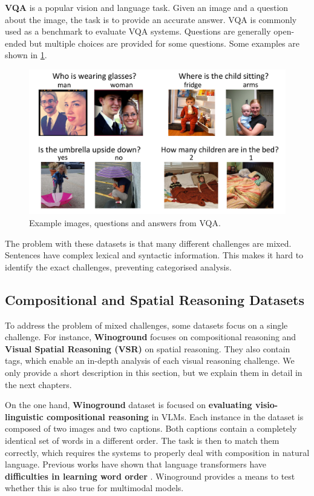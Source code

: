 \textbf{VQA} \cite{antol2015vqa} is a popular vision and language task. Given an image and a question about the image, the task is to provide an accurate answer. VQA is commonly used as a benchmark to evaluate VQA systems. Questions are generally open-ended but multiple choices are provided for some questions. Some examples are shown in \cref{fig:vqa_examples}.

\begin{figure}[ht]
    \centering
    \includegraphics[width=\linewidth]{images/datasets/vqa_examples.pdf}
    \caption{Example images, questions and answers from VQA.}
    \label{fig:vqa_examples}
\end{figure}

The problem with these datasets is that many different challenges are mixed. Sentences have complex lexical and syntactic information. This makes it hard to identify the exact challenges, preventing categorised analysis.

\subsection{Compositional and Spatial Reasoning Datasets} \label{sec:compositional_spatial_reasoning_datasets}

To address the problem of mixed challenges, some datasets focus on a single challenge. For instance, \textbf{Winoground} \cite{thrush2022winoground} focuses on compositional reasoning and \textbf{Visual Spatial Reasoning (VSR)} \cite{liu2022visual} on spatial reasoning. They also contain tags, which enable an in-depth analysis of each visual reasoning challenge. We only provide a short description in this section, but we explain them in detail in the next chapters.

On the one hand, \textbf{Winoground} dataset \cite{thrush2022winoground} is focused on \textbf{evaluating visio-linguistic compositional reasoning} in VLMs. Each instance in the dataset is composed of two images and two captions. Both captions contain a completely identical set of words in a different order. The task is then to match them correctly, which requires the systems to properly deal with composition in natural language. Previous works have shown that language transformers have \textbf{difficulties in learning word order} \cite{sinha2020unnatural,sinha2021matterslittle}. Winoground provides a means to test whether this is also true for multimodal models.

